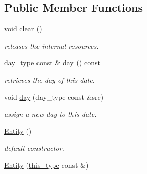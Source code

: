 \subsection*{Public Member Functions}
\begin{DoxyCompactItemize}
\item 
\hypertarget{classhryky_1_1date_1_1_entity_a0e0e89b17eb9a53fd4ef349d68a1276e}{void \hyperlink{classhryky_1_1date_1_1_entity_a0e0e89b17eb9a53fd4ef349d68a1276e}{clear} ()}\label{classhryky_1_1date_1_1_entity_a0e0e89b17eb9a53fd4ef349d68a1276e}

\begin{DoxyCompactList}\small\item\em releases the internal resources. \end{DoxyCompactList}\item 
\hypertarget{classhryky_1_1date_1_1_entity_aaefb61c65369ddfb978887ae18fae306}{day\-\_\-type const \& \hyperlink{classhryky_1_1date_1_1_entity_aaefb61c65369ddfb978887ae18fae306}{day} () const }\label{classhryky_1_1date_1_1_entity_aaefb61c65369ddfb978887ae18fae306}

\begin{DoxyCompactList}\small\item\em retrieves the day of this date. \end{DoxyCompactList}\item 
\hypertarget{classhryky_1_1date_1_1_entity_a5d39d136994db43893536946b2a32092}{void \hyperlink{classhryky_1_1date_1_1_entity_a5d39d136994db43893536946b2a32092}{day} (day\-\_\-type const \&src)}\label{classhryky_1_1date_1_1_entity_a5d39d136994db43893536946b2a32092}

\begin{DoxyCompactList}\small\item\em assign a new day to this date. \end{DoxyCompactList}\item 
\hypertarget{classhryky_1_1date_1_1_entity_ac1d4377ec363601895854d04e07cd4fe}{\hyperlink{classhryky_1_1date_1_1_entity_ac1d4377ec363601895854d04e07cd4fe}{Entity} ()}\label{classhryky_1_1date_1_1_entity_ac1d4377ec363601895854d04e07cd4fe}

\begin{DoxyCompactList}\small\item\em default constructor. \end{DoxyCompactList}\item 
\hypertarget{classhryky_1_1date_1_1_entity_afcfa43a82c53e9134cb3e1d692fa576f}{\hyperlink{classhryky_1_1date_1_1_entity_afcfa43a82c53e9134cb3e1d692fa576f}{Entity} (\hyperlink{classhryky_1_1date_1_1_entity_aa89e431c521eed48992301fe010a9eaa}{this\-\_\-type} const \&)}\label{classhryky_1_1date_1_1_entity_afcfa43a82c53e9134cb3e1d692fa576f}


\end{DoxyCompactItemize}
